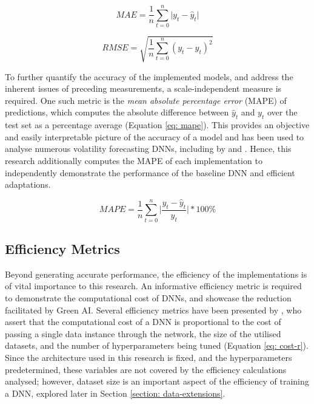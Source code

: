 \documentclass[a4paper, 11pt]{report}
\begin{document}
    \begin{equation}
        \label{eq: mae}
        MAE = \frac{1}{n} \sum_{t=0}^n \lvert y_t - \hat{y}_t \lvert
    \end{equation}
    
    \begin{equation}
        \label{eq: rmse}
        RMSE = \sqrt{\frac{1}{n} \sum_{t=0}^n (y_t - \hat{y}_t)^2}
    \end{equation}


    To further quantify the accuracy of the implemented models, and address the inherent issues of preceding measurements, a scale-independent measure is required. One such metric is the \emph{mean absolute percentage error }(MAPE) of predictions, which computes the absolute difference between $\hat{y}_t$ and $y_t$ over the test set as a percentage average (Equation \ref{eq: mape}). This provides an objective and easily interpretable picture of the accuracy of a model and has been used to analyse numerous volatility forecasting DNNs, including by \citet{xiong-2016} and \citet{zhang-2022}. Hence, this research additionally computes the MAPE of each implementation to independently demonstrate the performance of the baseline DNN and efficient adaptations.


    \begin{equation}
        \label{eq: mape}
        MAPE = \frac{1}{n} \sum_{t=0}^n \bigg\lvert \frac{y_t - \hat{y}_t}{y_t} \bigg\lvert * 100\%
    \end{equation}


    \subsection{Efficiency Metrics}
    \label{section: efficiency-metrics}

    Beyond generating accurate performance, the efficiency of the implementations is of vital importance to this research. An informative efficiency metric is required to demonstrate the computational cost of DNNs, and showcase the reduction facilitated by Green AI. Several efficiency metrics have been presented by \citet{schwartz-2019}, who assert that the computational cost of a DNN is proportional to the cost of passing a single data instance through the network, the size of the utilised datasets, and the number of hyperparameters being tuned (Equation \ref{eq: cost-r}). Since the architecture used in this research is fixed, and the hyperparameters predetermined, these variables are not covered by the efficiency calculations analysed; however, dataset size is an important aspect of the efficiency of training a DNN, explored later in Section \ref{section: data-extensions}.
\end{document}
